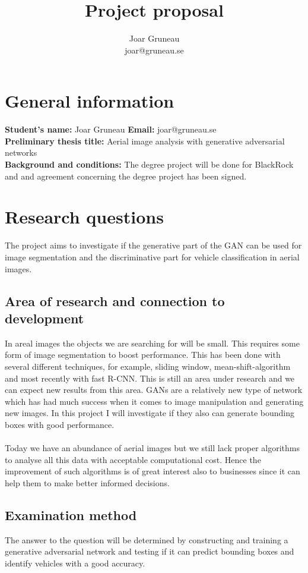\documentclass[a4paper,11pt]{article}
\title{Project proposal}
\author{Joar Gruneau \\ joar@gruneau.se}
\affil{Degree project}
\date{}
\begin{document}
\maketitle
\section{General information}
\textbf{Student's name:} Joar Gruneau \textbf{Email:} joar@gruneau.se\\
\textbf{Preliminary thesis title:} Aerial image analysis with generative adversarial networks\\
\textbf{Background and conditions:} The degree project will be done for BlackRock and and agreement concerning the degree project has been signed.
\section{Research questions} The project aims to investigate if the generative part of the GAN can be used for image segmentation and the discriminative part for vehicle classification in aerial images.
\subsection{Area of research and connection to development} 
In areal images the objects we are searching for will be small. This requires some form of image segmentation to boost performance. This has been done with several different techniques, for example, sliding window, mean-shift-algorithm and most recently with fast R-CNN. This is still an area under research and we can expect new results from this area. GANs are a relatively new type of network which has had much success when it comes to image manipulation and generating new images. In this project I will investigate if they also can generate bounding boxes with good performance.\\
\\
Today we have an abundance of aerial images but we still lack proper algorithms to analyse all this data with acceptable computational cost. Hence the improvement of such algorithms is of great interest also to businesses since it can help them to make better informed decisions.
\subsection{Examination method} The answer to the question will be determined by constructing and training a generative adversarial network and testing if it can predict bounding boxes and identify vehicles with a good accuracy.
\end{document}
